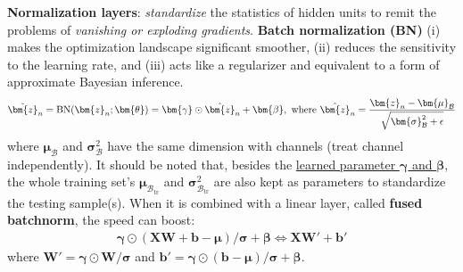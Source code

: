 \textbf{Normalization layers}: 
\textit{standardize} the statistics of hidden units to remit the problems of \textit{vanishing or exploding gradients}.
\textbf{Batch normalization (BN)}
(i) makes the optimization landscape significant smoother, 
(ii) reduces the sensitivity to the learning rate, and 
(iii) acts like a regularizer and equivalent to a form of approximate Bayesian inference.
\begin{gather}
    \Tilde{\bm{z}}_n=\mathrm{BN}(\bm{z}_n;\bm{\theta})=\bm{\gamma}\odot\hat{\bm{z}}_n+\bm{\beta},~
    \text{where}~\hat{\bm{z}}_n=\frac{\bm{z}_n-\bm{\mu}_\mathcal{B}}{\sqrt{\bm{\sigma}_\mathcal{B}^2+\epsilon}}
\end{gather}
where $\bm{\mu}_\mathcal{B}$ and $\bm{\sigma}_\mathcal{B}^2$ have the same dimension with channels (treat channel independently).
It should be noted that, besides the \uline{learned parameter $\bm{\gamma}$ and $\bm{\beta}$}, 
the whole training set's $\bm{\mu}_{\mathcal{B}_\text{tr}}$ and $\bm{\sigma}_{\mathcal{B}_\text{tr}}^2$ 
are also kept as parameters to standardize the testing sample(s).
When it is combined with a linear layer, called \textbf{fused batchnorm}, the speed can boost:
\begin{gather}
    \bm{\gamma}\odot(\mathbf{XW}+\bm{b}-\bm{\mu})/\bm{\sigma}+\bm{\beta} \iff \mathbf{XW}'+\bm{b}'
\end{gather}
where $\mathbf{W}'=\bm{\gamma}\odot\mathbf{W}/\bm{\sigma}$ and $\bm{b}'=\bm{\gamma}\odot(\bm{b}-\bm{\mu})/\bm{\sigma}+\bm{\beta}$.



